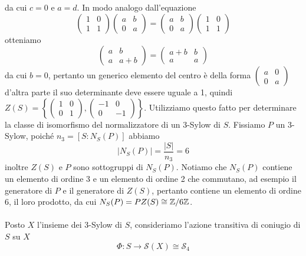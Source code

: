 \documentclass[11pt]{scrartcl}
\begin{document}
	da cui $c = 0$ e $a = d$. In modo analogo dall'equazione
	\[
	\begin{pmatrix}
		1 & 0\\
		1 & 1
	\end{pmatrix}
	\begin{pmatrix}
		a & b\\
		0 & a
	\end{pmatrix} = 
	\begin{pmatrix}
		a & b\\
		0 & a
	\end{pmatrix}
	\begin{pmatrix}
		1 & 0\\
		1 & 1
	\end{pmatrix}
	\]
	otteniamo 
	\[
	\begin{pmatrix}
		a & b\\
		a & a + b
	\end{pmatrix} = 
	\begin{pmatrix}
		a + b & b\\
		a & a
	\end{pmatrix}
	\]
	da cui $b = 0$, pertanto un generico elemento del centro è della forma
	$
	\begin{pmatrix}
		a & 0\\
		0 & a
	\end{pmatrix}
	$
	d'altra parte il suo determinante deve essere uguale a 1, quindi $Z(S) = 
	\left\{\begin{pmatrix}
		1 & 0\\
		0 & 1
	\end{pmatrix}, \begin{pmatrix}
		-1 & 0\\
		0 & -1
	\end{pmatrix}\right\}$. Utilizziamo questo fatto per determinare la classe
	di isomorfismo del normalizzatore di un 3-Sylow di $S$. \newline 
	Fissiamo $P$ un 3-Sylow, poiché $n_3 = [S: N_S(P)]$ abbiamo 
	\[
	|N_S(P)| = \frac{|S|}{n_3} = 6
	\]
	inoltre $Z(S)$ e $P$ sono sottogruppi di $N_S(P)$. Notiamo che $N_S(P)$
	contiene un elemento di ordine 3 e un elemento di ordine 2 che commutano, 
	ad esempio il generatore di $P$ e il generatore di $Z(S)$,
	pertanto contiene un elemento di ordine 6, il loro prodotto, da cui 
	$N_S(P) = PZ(S) \cong \mathbb{Z}/{6}\mathbb{Z}$.
	\\\\
	Posto $X$ l'insieme dei 3-Sylow di $S$, consideriamo
	l'azione transitiva di coniugio di $S$ su $X$
	\[
	\Phi: S \longrightarrow \mathcal{S}(X) \cong \mathcal{S}_4
	\]
\end{document}
